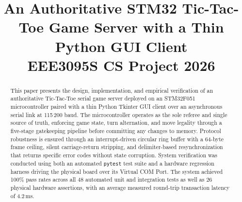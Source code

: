 \documentclass[conference]{IEEEtran}
\begin{document}
\title{An Authoritative STM32 Tic-Tac-Toe Game Server with a Thin Python GUI Client\\[2pt]
\normalsize EEE3095S CS Project 2026}

\author{
}

\maketitle

\begin{abstract}
This paper presents the design, implementation, and empirical verification of an authoritative Tic-Tac-Toe serial game server deployed on an STM32F051 microcontroller paired with a thin Python Tkinter GUI client over an asynchronous serial link at 115\,200 baud.
The microcontroller operates as the sole referee and single source of truth, enforcing game state, turn alternation, and move legality through a five-stage gatekeeping pipeline before committing any changes to memory.
Protocol robustness is ensured through an interrupt-driven circular ring buffer with a 64-byte frame ceiling, silent carriage-return stripping, and delimiter-based resynchronization that returns specific error codes without state corruption.
System verification was conducted using both an automated \texttt{pytest} test suite and a hardware regression harness driving the physical board over its Virtual COM Port.
The system achieved 100\% pass rates across all 48 automated unit and integration tests as well as 26 physical hardware assertions, with an average measured round-trip transaction latency of 4.2\,ms.
\end{abstract}










\end{document}
